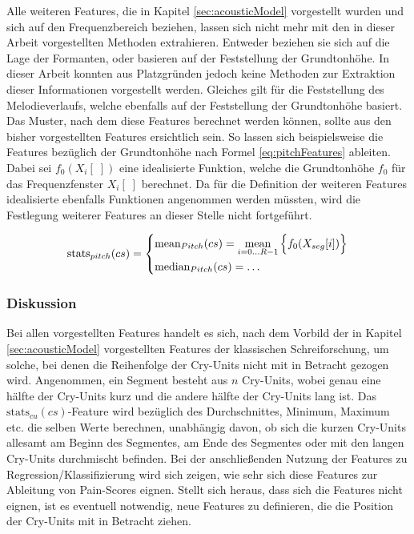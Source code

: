 Alle weiteren Features, die in Kapitel \ref{sec:acousticModel} vorgestellt wurden und sich auf den Frequenzbereich beziehen, lassen sich nicht mehr mit den in dieser Arbeit vorgestellten Methoden extrahieren. Entweder beziehen sie sich auf die Lage der Formanten, oder basieren auf der Feststellung der Grundtonhöhe. In dieser Arbeit konnten aus Platzgründen jedoch keine Methoden zur Extraktion dieser Informationen vorgestellt werden. Gleiches gilt für die Feststellung des Melodieverlaufs, welche ebenfalls auf der Feststellung der Grundtonhöhe basiert. Das Muster, nach dem diese Features berechnet werden können, sollte aus den bisher vorgestellten Features ersichtlich sein. So lassen sich beispielsweise die Features bezüglich der Grundtonhöhe nach Formel \ref{eq:pitchFeatures} ableiten. Dabei sei $f_0(X_i[\;])$ eine idealisierte Funktion, welche die Grundtonhöhe $f_0$ für das Frequenzfenster $X_i[\;]$ berechnet. Da für die Definition der weiteren Features idealisierte ebenfalls Funktionen angenommen werden müssten, wird die Festlegung weiterer Features an dieser Stelle nicht fortgeführt. 

\begin{equation}
\text{stats}_{pitch}(cs) = 
\begin{dcases}
\text{mean}_{Pitch}(cs) = \operatorname*{mean}_{i=0\ldots R-1} \Big\{ f_0(X_{seg}[i]) \Big\} \\
\text{median}_{Pitch}(cs) = \ldots
\end{dcases}
\label{eq:pitchFeatures}
\end{equation}

\subsubsection*{Diskussion}

Bei allen vorgestellten Features handelt es sich, nach dem Vorbild der in Kapitel \ref{sec:acousticModel} vorgestellten Features der klassischen Schreiforschung, um solche, bei denen die Reihenfolge der Cry-Units nicht mit in Betracht gezogen wird. Angenommen, ein Segment besteht aus $n$ Cry-Units, wobei genau eine hälfte der  Cry-Units kurz und die andere hälfte der Cry-Units lang ist. Das $\text{stats}_{cu}(cs)$-Feature wird bezüglich des Durchschnittes, Minimum, Maximum etc. die selben Werte berechnen, unabhängig davon, ob sich die kurzen Cry-Units allesamt am Beginn des Segmentes, am Ende des Segmentes oder mit den langen Cry-Units durchmischt befinden. Bei der anschließenden Nutzung der Features zu Regression/Klassifizierung wird sich zeigen, wie sehr sich diese Features zur Ableitung von Pain-Scores eignen. Stellt sich heraus, dass sich die Features nicht eignen, ist es eventuell notwendig, neue Features zu definieren, die die Position der Cry-Units mit in Betracht ziehen.

